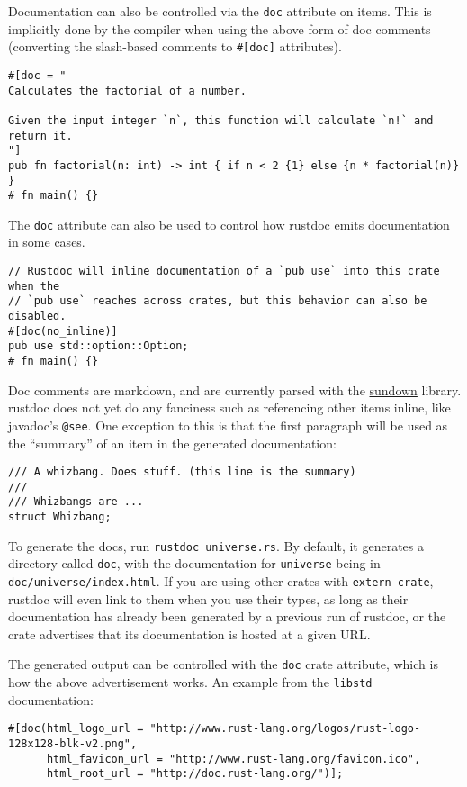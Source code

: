 \documentclass[]{article}
\begin{document}
Documentation can also be controlled via the \texttt{doc} attribute on
items. This is implicitly done by the compiler when using the above form
of doc comments (converting the slash-based comments to
\texttt{\#{[}doc{]}} attributes).

\begin{verbatim}
#[doc = "
Calculates the factorial of a number.

Given the input integer `n`, this function will calculate `n!` and return it.
"]
pub fn factorial(n: int) -> int { if n < 2 {1} else {n * factorial(n)} }
# fn main() {}
\end{verbatim}

The \texttt{doc} attribute can also be used to control how rustdoc emits
documentation in some cases.

\begin{verbatim}
// Rustdoc will inline documentation of a `pub use` into this crate when the
// `pub use` reaches across crates, but this behavior can also be disabled.
#[doc(no_inline)]
pub use std::option::Option;
# fn main() {}
\end{verbatim}

Doc comments are markdown, and are currently parsed with the
\href{https://github.com/vmg/sundown/}{sundown} library. rustdoc does
not yet do any fanciness such as referencing other items inline, like
javadoc's \texttt{@see}. One exception to this is that the first
paragraph will be used as the ``summary'' of an item in the generated
documentation:

\begin{verbatim}
/// A whizbang. Does stuff. (this line is the summary)
///
/// Whizbangs are ...
struct Whizbang;
\end{verbatim}

To generate the docs, run \texttt{rustdoc universe.rs}. By default, it
generates a directory called \texttt{doc}, with the documentation for
\texttt{universe} being in \texttt{doc/universe/index.html}. If you are
using other crates with \texttt{extern crate}, rustdoc will even link to
them when you use their types, as long as their documentation has
already been generated by a previous run of rustdoc, or the crate
advertises that its documentation is hosted at a given URL.

The generated output can be controlled with the \texttt{doc} crate
attribute, which is how the above advertisement works. An example from
the \texttt{libstd} documentation:

\begin{verbatim}
#[doc(html_logo_url = "http://www.rust-lang.org/logos/rust-logo-128x128-blk-v2.png",
      html_favicon_url = "http://www.rust-lang.org/favicon.ico",
      html_root_url = "http://doc.rust-lang.org/")];
\end{verbatim}
\end{document}
